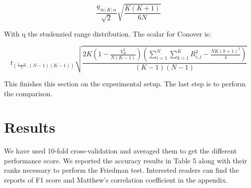 \documentclass[a4paper,12pt]{article}
\numberwithin{equation}{section}
\begin{document}
\begin{equation*}
\frac{q_{\infty;K;\alpha}}{\sqrt{2}}\sqrt{\frac{K(K+1)}{6N}}
\end{equation*}

With q the studenzied range distribution. The scalar for Conover is:

\begin{equation*}
t_{(\frac{1-\alpha}{2},(N-1)(K-1))}\sqrt{\frac{2K(1-\frac{\chi^2_R}{N(K-1)})(\sum_{i=1}^{N}\sum_{k=1}^KR^2_{i,j}-\frac{NK(k+1)^2}{4})}{(K-1)(N-1)}}
\end{equation*}

This finishes this section on the experimental setup. The last step is to perform the comparison. 




\newpage
\section{Results}

We have used 10-fold cross-validation and averaged them to get the different performance score. We reported the accuracy results in Table 5 along with their ranks necessary to perform the Friedman test. Interested readers can find the reports of F1 score and Matthew's correlation coefficient in the appendix.  
\end{document}
